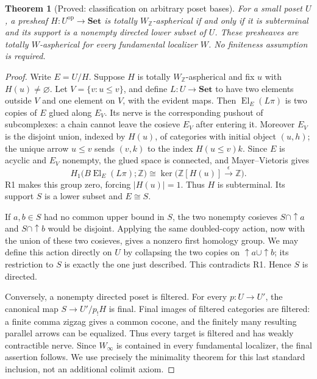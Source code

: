 \documentclass[11pt,a4paper]{article}
\newtheorem{theorem}{Theorem}[section]
\theoremstyle{definition}
\theoremstyle{remark}
\newcommand{\Set}{\mathbf{Set}}
\newcommand{\Z}{\mathbb Z}
\newcommand{\op}{\mathrm{op}}
\newcommand{\Winfty}{W_\infty}
\newcommand{\WZ}{W_{\mathbb Z}}
\newcommand{\El}{\operatorname{El}}
\begin{document}
\begin{theorem}[Proved: classification on arbitrary poset bases]\label{A:posets}
For a small poset $U$, a presheaf $H:U^{\op}\to\Set$ is totally $\WZ$-aspherical if and only if it is subterminal and its support is a nonempty directed lower subset of $U$. These presheaves are totally $W$-aspherical for every fundamental localizer $W$. No finiteness assumption is required.
\end{theorem}
\begin{proof}
Write $E=U/H$. Suppose $H$ is totally $\WZ$-aspherical and fix $u$ with $H(u)\ne\varnothing$. Let $V=\{v:u\leq v\}$, and define $L:U\to\Set$ to have two elements outside $V$ and one element on $V$, with the evident maps. Then $\El_E(L\pi)$ is two copies of $E$ glued along $E_V$. Its nerve is the corresponding pushout of subcomplexes: a chain cannot leave the cosieve $E_V$ after entering it. Moreover $E_V$ is the disjoint union, indexed by $H(u)$, of categories with initial object $(u,h)$; the unique arrow $u\leq v$ sends $(v,k)$ to the index $H(u\leq v)k$. Since $E$ is acyclic and $E_V$ nonempty, the glued space is connected, and Mayer--Vietoris gives
\[
 H_1\bigl(B\El_E(L\pi);\Z\bigr)
 \cong\ker\bigl(\Z[H(u)]\xrightarrow{\epsilon}\Z\bigr).
\]
R1 makes this group zero, forcing $|H(u)|=1$. Thus $H$ is subterminal. Its support $S$ is a lower subset and $E\cong S$.

If $a,b\in S$ had no common upper bound in $S$, the two nonempty cosieves $S\cap\uparrow a$ and $S\cap\uparrow b$ would be disjoint. Applying the same doubled-copy action, now with the union of these two cosieves, gives a nonzero first homology group. We may define this action directly on $U$ by collapsing the two copies on $\uparrow a\cup\uparrow b$; its restriction to $S$ is exactly the one just described. This contradicts R1. Hence $S$ is directed.

Conversely, a nonempty directed poset is filtered. For every $p:U\to U'$, the canonical map $S\to U'/p_!H$ is final. Final images of filtered categories are filtered: a finite comma zigzag gives a common cocone, and the finitely many resulting parallel arrows can be equalized. Thus every target is filtered and has weakly contractible nerve. Since $\Winfty$ is contained in every fundamental localizer, the final assertion follows. We use precisely the minimality theorem \citep[Theorem~6.1.18]{Cisinski2006} for this last standard inclusion, not an additional colimit axiom.
\end{proof}
\end{document}
